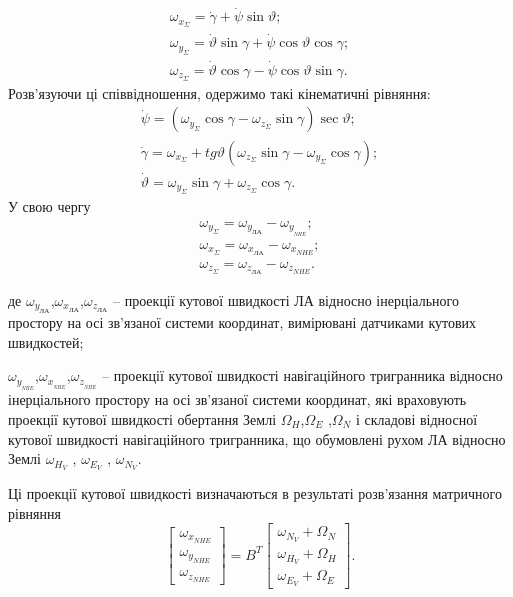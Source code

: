 \[\begin{array}{l} 
{\omega_{x_{\Sigma } } =\dot{\gamma }+\dot{\psi }\sin \vartheta ;} \\ 
{\omega_{y_{\Sigma } } =\dot{\vartheta }\sin \gamma +\dot{\psi}\cos \vartheta\cos \gamma ;} \\ 
{\omega_{z_{\Sigma } } =\dot{\vartheta }\cos \gamma -\dot{\psi}\cos \vartheta \sin \gamma .} 
\end{array}\] 
Розв'язуючи ці співвідношення, одержимо такі кінематичні рівняння:
\[\begin{array}{l} 
{\dot{\psi }=(\omega_{y_{\Sigma } } \cos \gamma -\omega_{z_{\Sigma }} \sin \gamma)\sec \vartheta ;} \\ 
{\dot{\gamma }=\omega_{x_{\Sigma } } +tg\vartheta (\omega_{z_{\Sigma } } \sin \gamma -\omega_{y_{\Sigma } } \cos \gamma );} \\ 
{\dot{\vartheta }=\omega_{y_{\Sigma } } \sin \gamma +\omega_{z_{\Sigma }} \cos \gamma.} 
\end{array}\] 
У свою чергу 
\[ \begin{array}{l} 
  {\omega_{y_{\Sigma } } =\omega_{y_{\text{ЛА}} } -\omega_{y_{_{NHE}}};} \\ 
  {\omega_{x_{\Sigma } } =\omega_{x_{\text{ЛА}}}  -\omega_{x_{NHE}} ;} \\ 
  {\omega_{z_{\Sigma } } =\omega_{z_{\text{ЛА}}}  -\omega_{z_{NHE}}.} \end{array}\] 
\begin{ESKDexplanation}
\item де $\omega_{y_{\text{ЛА}}}$,$\omega_{x_{\text{ЛА}}}$,$\omega_{z_{\text{ЛА}}}$ -- проекції 
кутової швидкості ЛА відносно інерціального простору на осі зв'язаної системи координат, 
вимірювані датчиками кутових швидкостей;
\item $\omega_{y_{_{NHE}}}$,$\omega_{x_{_{NHE}}}$,$\omega_{z_{_{NHE}}}$  -- проекції кутової швидкості навігаційного тригранника 
відносно інерціального простору на осі зв'язаної системи координат, які враховують 
проекції кутової швидкості обертання Землі  $\Omega_{H}$,$\Omega_{E}$ ,$\Omega_{N}$
і складові відносної кутової швидкості навігаційного тригранника, 
що обумовлені рухом ЛА відносно Землі $\omega_{H_{V}}$ , $\omega_{E_{V}}$ ,
$\omega_{N_{V}} $. 
\end{ESKDexplanation}
Ці проекції кутової швидкості визначаються в результаті 
розв'язання матричного рівняння 
\[\left
[\begin{array}{c} {\omega_{x_{NHE} } } \\ 
{\omega_{y_{NHE} } } \\ 
{\omega_{z_{NHE} } } 
\end{array}\right]
=B^{T} 
\left[\begin{array}{c} {\omega_{N_{V} 
} +\Omega_{N} } \\ 
{\omega_{H_{V} } +\Omega_{H} } \\ 
{\omega_{E_{V} } +\Omega_{E} } 
\end{array}\right] .\] 
